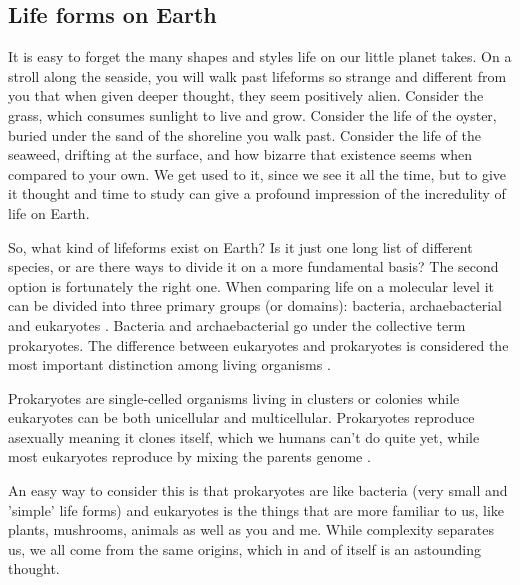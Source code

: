 \subsection*{Life forms on Earth}

It is easy to forget the many shapes and styles life on our little planet takes. On a stroll along the seaside, you will walk past lifeforms so strange and different from you that when given deeper thought, they seem positively alien.
Consider the grass, which consumes sunlight to live and grow. Consider the life of the oyster, buried under the sand of the shoreline you walk past.
Consider the life of the seaweed, drifting at the surface, and how bizarre that existence seems when compared to your own.
We get used to it, since we see it all the time, but to give it thought and time to study can give a profound impression of the incredulity of life on Earth.

So, what kind of lifeforms exist on Earth?
Is it just one long list of different species, or are there ways to divide it on a more fundamental basis?
The second option is fortunately the right one.
When comparing life on a molecular level it can be divided into three primary groups (or domains): bacteria, archaebacterial and eukaryotes \cite{Eukaryotes}.
Bacteria and archaebacterial go under the collective term prokaryotes.
The difference between eukaryotes and prokaryotes is considered the most important distinction among living organisms \cite{Procaryotes}. 

Prokaryotes are single-celled organisms living in clusters or colonies while eukaryotes can be both unicellular and multicellular.
Prokaryotes reproduce asexually meaning it clones itself, which we humans can't do quite yet, while most eukaryotes reproduce by mixing the parents genome \cite{ProcaEuka}. 

An easy way to consider this is that prokaryotes are like bacteria (very small and 'simple' life forms) and eukaryotes is the things that are more familiar to us, like plants, mushrooms, animals as well as you and me.
While complexity separates us, we all come from the same origins, which in and of itself is an astounding thought.

